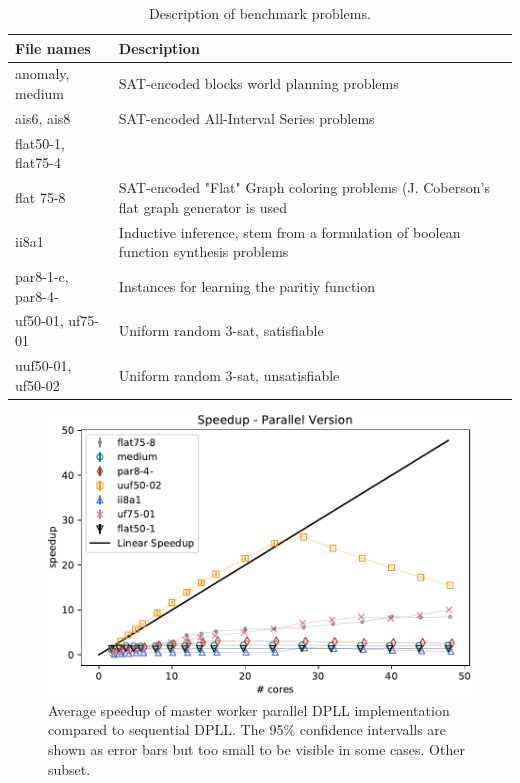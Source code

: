 \documentclass[letterpaper]{article}
\begin{document}
\begin{table}[h]
    \centering
    \begin{tabularx}{\columnwidth}{|l|X|}
        \hline
        File names & Description\\
        \hline
        \hline
        anomaly, medium & SAT-encoded blocks world planning problems\\
        \hline
        ais6, ais8 & SAT-encoded All-Interval Series problems\\
        \hline
        flat50-1, flat75-4 \\ flat 75-8 & SAT-encoded "Flat" Graph coloring problems (J. Coberson's flat graph generator is used\\
        \hline
        ii8a1 & Inductive inference, stem from a formulation of boolean function synthesis problems\\
        \hline
        par8-1-c, par8-4- & Instances for learning the paritiy function\\
        \hline
        uf50-01, uf75-01 & Uniform random 3-sat, satisfiable\\
        \hline
        uuf50-01, uf50-02 & Uniform random 3-sat, unsatisfiable\\
        \hline
    \end{tabularx}
    \caption{Description of benchmark problems.}
    \label{tab:benchmark_set}
\end{table}

\begin{figure}[h]
    \centering
    \includegraphics[width=\columnwidth]{figures/scaling_parallel_non_subset_dpll_scaling_tar.pdf}
    \caption{Average speedup of master worker parallel DPLL implementation compared to sequential DPLL.
    The 95\% confidence intervalls are shown as error bars but too small to be visible in some cases.
    Other subset.}
    \label{fig:dpll_parallel_speedup_non}
\end{figure}
\end{document}
